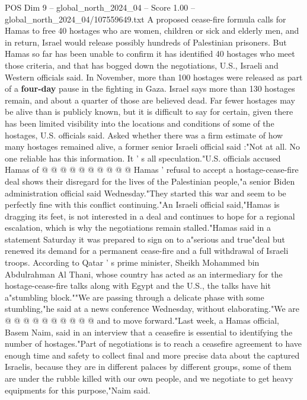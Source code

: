 \begin{textsample}{POS Dim 9 – global\_north\_2024\_04 – Score 1.00 – global\_north\_2024\_04/107559649.txt}  \label{ex:f9_pos_233}
A proposed cease-fire formula calls for Hamas to free 40 hostages who are women, children or sick and elderly men, and in return, Israel would release possibly hundreds of Palestinian prisoners.
But Hamas so far has been unable to confirm it has identified 40 hostages who meet those criteria, and that has bogged down the negotiations, U.S., Israeli and Western officials said.
In November, more than 100 hostages were released as part of a \textbf{four-day} pause in the fighting in Gaza.
Israel says more than 130 hostages remain, and about a quarter of those are believed dead.
Far fewer hostages may be alive than is publicly known, but it is difficult to say for certain, given there has been limited visibility into the locations and conditions of some of the hostages, U.S. officials said.
Asked whether there was a firm estimate of how many hostages remained alive, a former senior Israeli official said :"Not at all.
No one reliable has this information.
It ' s all speculation."U.S. officials accused Hamas of @ @ @ @ @ @ @ @ @ @ Hamas ' refusal to accept a hostage-cease-fire deal shows their disregard for the lives of the Palestinian people,"a senior Biden administration official said Wednesday."They started this war and seem to be perfectly fine with this conflict continuing."An Israeli official said,"Hamas is dragging its feet, is not interested in a deal and continues to hope for a regional escalation, which is why the negotiations remain stalled."Hamas said in a statement Saturday it was prepared to sign on to a"serious and true"deal but renewed its demand for a permanent cease-fire and a full withdrawal of Israeli troops.
According to Qatar ' s prime minister, Sheikh Mohammed bin Abdulrahman Al Thani, whose country has acted as an intermediary for the hostage-cease-fire talks along with Egypt and the U.S., the talks have hit a"stumbling block.""We are passing through a delicate phase with some stumbling,"he said at a news conference Wednesday, without elaborating."We are @ @ @ @ @ @ @ @ @ @ and to move forward."Last week, a Hamas official, Basem Naim, said in an interview that a ceasefire is essential to identifying the number of hostages."Part of negotiations is to reach a ceasefire agreement to have enough time and safety to collect final and more precise data about the captured Israelis, because they are in different palaces by different groups, some of them are under the rubble killed with our own people, and we negotiate to get heavy equipments for this purpose,"Naim said.

\end{textsample}
